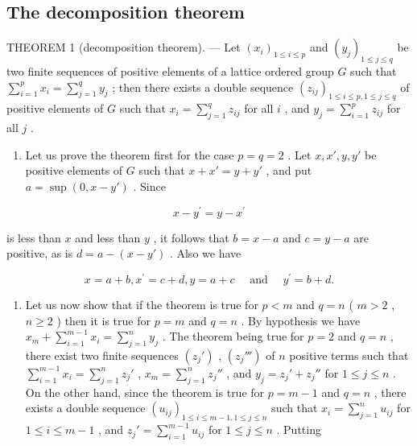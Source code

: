 \subsection{The decomposition theorem}

THEOREM 1 (decomposition theorem). --- Let \((x_i)_{1 \leq i \leq p}\) and \((y_j)_{1 \leq j \leq q}\) be two finite sequences of positive elements of a lattice ordered group \(G\) such that \(\sum_{i=1}^{p} x_i = \sum_{j=1}^{q} y_j\) ; then there exists a double sequence \((z_{ij})_{1 \leq i \leq p, 1 \leq j \leq q}\) of positive elements of \(G\) such that \(x_i = \sum_{j=1}^{q} z_{ij}\) for all \(i\) , and \(y_j = \sum_{i=1}^{p} z_{ij}\) for all \(j\) .

\begin{enumerate}
\def\labelenumi{\arabic{enumi})}
\tightlist
\item
  Let us prove the theorem first for the case \(p = q = 2\) . Let \(x, x', y, y'\) be positive elements of \(G\) such that \(x + x' = y + y'\) , and put \(a = \sup (0, x - y')\) . Since
\end{enumerate}

\[
x - y ^ {\prime} = y - x ^ {\prime}
\]

is less than \(x\) and less than \(y\) , it follows that \(b = x - a\) and \(c = y - a\) are positive, as is \(d = a - (x - y')\) . Also we have

\[
x = a + b, x ^ {\prime} = c + d, y = a + c \quad \text { and } \quad y ^ {\prime} = b + d.
\]

\begin{enumerate}
\def\labelenumi{\arabic{enumi})}
\setcounter{enumi}{1}
\tightlist
\item
  Let us now show that if the theorem is true for \(p < m\) and \(q = n\) ( \(m > 2\) , \(n \geqslant 2\) ) then it is true for \(p = m\) and \(q = n\) . By hypothesis we have \(x_{m} + \sum_{i=1}^{m-1} x_{i} = \sum_{j=1}^{n} y_{j}\) . The theorem being true for \(p = 2\) and \(q = n\) , there exist two finite sequences \((z_{j}')\) , \((z_{j}''')\) of \(n\) positive terms such that \(\sum_{i=1}^{m-1} x_{i} = \sum_{j=1}^{n} z_{j}'\) , \(x_{m} = \sum_{j=1}^{n} z_{j}''\) , and \(y_{j} = z_{j}' + z_{j}''\) for \(1 \leqslant j \leqslant n\) . On the other hand, since the theorem is true for \(p = m-1\) and \(q = n\) , there exists a double sequence \((u_{ij})_{1 \leqslant i \leqslant m-1, 1 \leqslant j \leqslant n}\) such that \(x_{i} = \sum_{j=1}^{n} u_{ij}\) for \(1 \leqslant i \leqslant m-1\) , and \(z_{j}' = \sum_{i=1}^{m-1} u_{ij}\) for \(1 \leqslant j \leqslant n\) . Putting
\end{enumerate}

